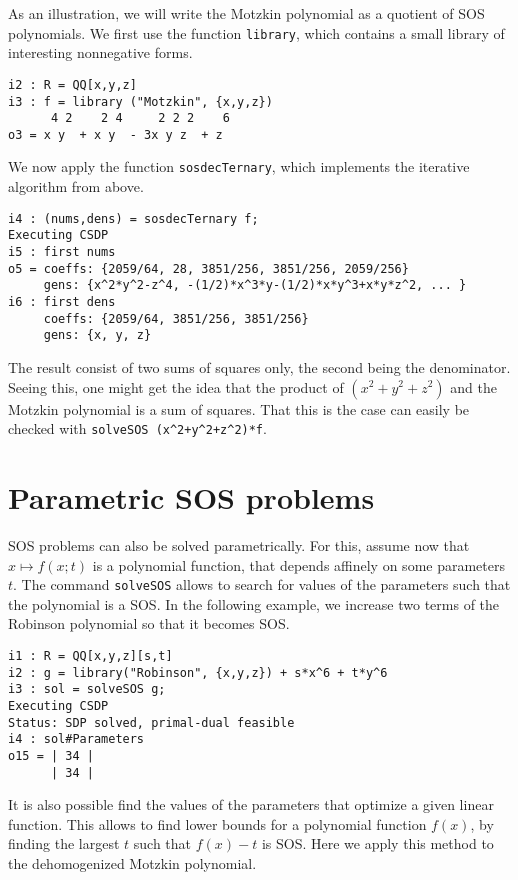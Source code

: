 \documentclass[11pt]{amsart}
\theoremstyle{plain}%
\theoremstyle{definition}
\theoremstyle{remark}
\begin{document}
As an illustration, we will write the Motzkin polynomial as a quotient of SOS polynomials.
We first use the function \verb|library|, which contains a small library of interesting nonnegative forms.
{\small
\begin{verbatim}
i2 : R = QQ[x,y,z]
i3 : f = library ("Motzkin", {x,y,z})
      4 2    2 4     2 2 2    6
o3 = x y  + x y  - 3x y z  + z
\end{verbatim}
}

\noindent 
We now apply the function \verb|sosdecTernary|, which implements the iterative algorithm from above.
{\small
\begin{verbatim}
i4 : (nums,dens) = sosdecTernary f;
Executing CSDP
i5 : first nums
o5 = coeffs: {2059/64, 28, 3851/256, 3851/256, 2059/256}
     gens: {x^2*y^2-z^4, -(1/2)*x^3*y-(1/2)*x*y^3+x*y*z^2, ... }
i6 : first dens
     coeffs: {2059/64, 3851/256, 3851/256}
     gens: {x, y, z}
\end{verbatim}
}

The result consist of two sums of squares only, the second being the denominator.
Seeing this, one might get the idea that the product of $(x^{2}+y^{2}+z^{2})$ and the Motzkin polynomial is a sum of squares.
That this is the case can easily be checked with \verb|solveSOS (x^2+y^2+z^2)*f|.

\section{Parametric SOS problems}

SOS problems can also be solved parametrically.
For this, assume now that $x \mapsto f(x;t)$ is a polynomial function, that depends affinely on some parameters~$t$.
The command \verb|solveSOS| allows to search for values of the parameters such that the polynomial is a SOS.
In the following example, we increase two terms of the Robinson polynomial so that it becomes SOS.

{\small
\begin{verbatim}
i1 : R = QQ[x,y,z][s,t]
i2 : g = library("Robinson", {x,y,z}) + s*x^6 + t*y^6
i3 : sol = solveSOS g;
Executing CSDP
Status: SDP solved, primal-dual feasible
i4 : sol#Parameters
o15 = | 34 |
      | 34 |
\end{verbatim}
}

It is also possible find the values of the parameters that optimize a given linear function.
This allows to find lower bounds for a polynomial function $f(x)$,
by finding the largest $t$ such that $f(x)-t$ is SOS.
Here we apply this method to the dehomogenized Motzkin polynomial.
\end{document}
